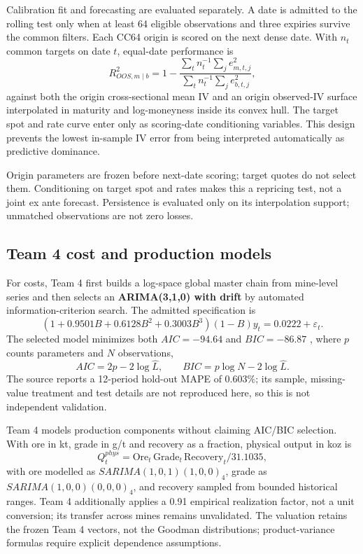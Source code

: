 Calibration fit and forecasting are evaluated separately. A date is admitted to the rolling test only when at least 64 eligible observations and three expiries survive the common filters. Each CC64 origin is scored on the next dense date. With $n_t$ common targets on date $t$, equal-date performance is
\begin{equation}
R^2_{OOS,m\mid b}=1-\frac{\sum_t n_t^{-1}\sum_j e_{m,t,j}^2}{\sum_t n_t^{-1}\sum_j e_{b,t,j}^2},
\label{eq:oos_r2}
\end{equation}
against both the origin cross-sectional mean IV and an origin observed-IV surface interpolated in maturity and log-moneyness inside its convex hull. The target spot and rate curve enter only as scoring-date conditioning variables. This design prevents the lowest in-sample IV error from being interpreted automatically as predictive dominance.

Origin parameters are frozen before next-date scoring; target quotes do not select them. Conditioning on target spot and rates makes this a repricing test, not a joint ex ante forecast. Persistence is evaluated only on its interpolation support; unmatched observations are not zero losses.

\subsection{Team 4 cost and production models}
For costs, Team 4 first builds a log-space global master chain from mine-level series and then selects an \textbf{ARIMA(3,1,0) with drift} by automated information-criterion search. The admitted specification is
\begin{equation}
(1+0.9501B+0.6128B^2+0.3003B^3)(1-B)y_t
=0.0222+\varepsilon_t.
\label{eq:cost_arima}
\end{equation}
The selected model minimizes both $AIC=-94.64$ and $BIC=-86.87$ \citep{akaike1974,schwarz1978}, where $p$ counts parameters and $N$ observations,
\begin{equation}
AIC=2p-2\log\widehat L,\qquad BIC=p\log N-2\log\widehat L.
\label{eq:aicbic}
\end{equation}
The source reports a 12-period hold-out MAPE of $0.603\%$; its sample, missing-value treatment and test details are not reproduced here, so this is not independent validation.

Team 4 models production components without claiming AIC/BIC selection. With ore in kt, grade in g/t and recovery as a fraction, physical output in koz is
\begin{equation}
Q_t^{phys}=\mathrm{Ore}_t\,\mathrm{Grade}_t\,\mathrm{Recovery}_t/31.1035,
\label{eq:production_formula}
\end{equation}
with ore modelled as $SARIMA(1,0,1)(1,0,0)_4$, grade as $SARIMA(1,0,0)(0,0,0)_4$, and recovery sampled from bounded historical ranges. Team 4 additionally applies a 0.91 empirical realization factor, not a unit conversion; its transfer across mines remains unvalidated. The valuation retains the frozen Team 4 vectors, not the Goodman distributions; product-variance formulas require explicit dependence assumptions.

